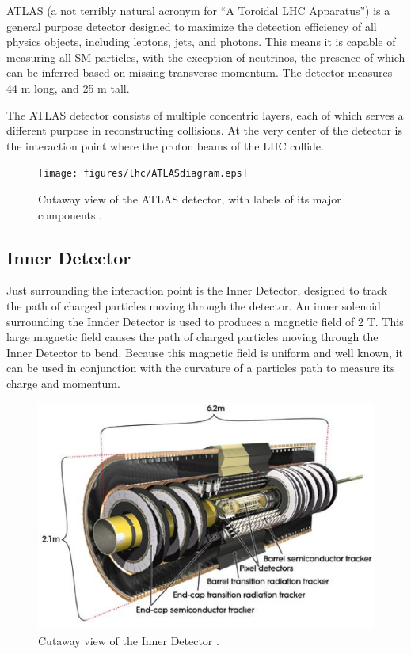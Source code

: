 ATLAS (a not terribly natural acronym for ``A Toroidal LHC Apparatus'') is a general purpose detector designed to maximize the detection efficiency of all physics objects, including leptons, jets, and photons. This means it is capable of measuring all SM particles, with the exception of neutrinos, the presence of which can be inferred based on missing transverse momentum. The detector measures 44 m long, and 25 m tall. 

The ATLAS detector consists of multiple concentric layers, each of which serves a different purpose in reconstructing collisions. At the very center of the detector is the interaction point where the proton beams of the LHC collide. 

\begin{figure}[H]
\centering
   \texttt{[image: figures/lhc/ATLASdiagram.eps]}
\caption{Cutaway view of the ATLAS detector, with labels of its major components \cite{ATLAS_figure}.}
\label{fig:ATLAS}
\end{figure}

\subsection{Inner Detector}
\label{sec:innerDetector}

Just surrounding the interaction point is the Inner Detector, designed to track the path of charged particles moving through the detector. An inner solenoid surrounding the Innder Detector is used to produces a magnetic field of 2 T. This large magnetic field causes the path of charged particles moving through the Inner Detector to bend. Because this magnetic field is uniform and well known, it can be used in conjunction with the curvature of a particles path to measure its charge and momentum.

\begin{figure}[H]
\centering
   \includegraphics[width=0.75\linewidth]{figures/lhc/InnerDetector.eps}
\caption{Cutaway view of the Inner Detector \cite{caloFig}.}
\label{fig:innerDect}
\end{figure}

